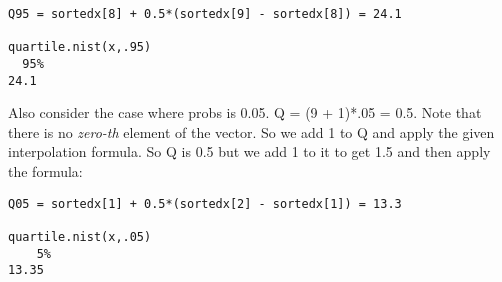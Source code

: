\documentclass{article}
\begin{document}
\begin{verbatim}
Q95 = sortedx[8] + 0.5*(sortedx[9] - sortedx[8]) = 24.1 

quartile.nist(x,.95)
  95% 
24.1 

\end{verbatim}
\noindent
Also consider the case where probs is 0.05. Q = (9 + 1)*.05 = 0.5. Note that there is no \emph{zero-th} element of the vector. So we add 1 to Q and apply the given interpolation formula. So Q is 0.5 but we add 1 to it to get 1.5 and then apply the formula:
\begin{verbatim}
Q05 = sortedx[1] + 0.5*(sortedx[2] - sortedx[1]) = 13.3

quartile.nist(x,.05)
    5% 
13.35 
\end{verbatim}
\end{document}
